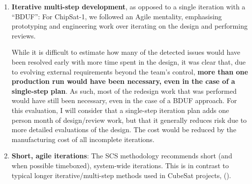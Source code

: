 \documentclass[a4paper,nobib,justified,final]{tufte-book}
\begin{document}
\begin{enumerate}
	For this counter-factual analysis, I will consider that an unpopulated \acs{PCB} is still manufactured externally,\footnote{This is standard in most cases, as unpopulated \acs{PCB} manufacturing generally requires more specialised equipment, and external procurement can have very low lead times.} but soldering is done in-house with a reflow process, taking up 3 working days, multiplied by the 3 \acs{PCB} runs of the project\footnote{This estimation is based on results from AI4Space () and ChiPySat.}. I also consider two risk factors, summing up to no perceptible risk change: 

	In larger space projects, external manufacturing is also associated with higher workmanship quality. However, the low number of components, low overall stresses, and short mission durations of \acs{SCS} generally reduce workmanship requirements, and there are no documented failures because of poor electronics manufacturing (). As such, and considering the above risk factors, I will not consider a risk increase for in-house electronics manufacturing.	
	\item \textbf{Iterative multi-step development}, as opposed to a single iteration with a ``\acl{BDUF}'':
	For ChipSat-1, we followed an Agile mentality, emphasising prototyping and engineering work over iterating on the design and performing reviews.

	While it is difficult to estimate how many of the detected issues would have been resolved early with more time spent in the design, it was clear that, due to evolving external requirements beyond the team's control, \textbf{more than one production run would have been necessary, even in the case of a single-step plan}.
	As such, most of the redesign work that was performed would have still been necessary, even in the case of a \acs{BDUF} approach. For this evaluation, I will consider that a single-step iteration plan adds one person month of design/review work, but that it generally reduces risk due to more detailed evaluations of the design. The cost would be reduced by the manufacturing cost of all incomplete iterations.
	\item \textbf{Short, agile iterations}:
	The \acs{SCS} methodology recommends short (and when possible timeboxed), system-wide iterations. This is in contrast to typical longer iterative/multi-step methods used in CubeSat projects, ().


\end{enumerate}
\end{document}
